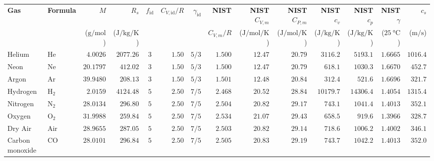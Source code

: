 \begin{table}[!htbp]
\centering
{}\label{tab:06:gas-properties}
\footnotesize\setlength{\tabcolsep}{3.2pt}\renewcommand{\arraystretch}{1.10}
\begin{tabularx}{\linewidth}{@{}l l r r c r r r r r r r r r@{}}
\toprule
\textbf{Gas} & \textbf{Formula} & $M$ & $R_s$ & $f_{\mathrm{id}}$ & $C_{V,\mathrm{id}}/R$ & $\gamma_{\mathrm{id}}$ & \textbf{NIST} & \textbf{NIST} $C_{V,m}$ & \textbf{NIST} $C_{P,m}$ & \textbf{NIST} $c_v$ & \textbf{NIST} $c_p$ & \textbf{NIST} $\gamma$ & $c_s$ \\
 & & ($\si{\gram\per\mole}$) & ($\si{\joule\per\kilogram\per\kelvin}$) & & & & $C_{V,m}/R$ & ($\si{\joule\per\mole\per\kelvin}$) & ($\si{\joule\per\mole\per\kelvin}$) & ($\si{\joule\per\kilogram\per\kelvin}$) & ($\si{\joule\per\kilogram\per\kelvin}$) & ($\SI{25}{\celsius}$) & ($\si{\meter\per\second}$) \\
\midrule
Helium & $\mathrm{He}$ & $4.0026$ & $2077.26$ & $3$ & $1.50$ & $5/3$ & $1.500$ & $12.47$ & $20.79$ & $3116.2$ & $5193.1$ & $1.6665$ & $1016.4$ \\
Neon & $\mathrm{Ne}$ & $20.1797$ & $412.02$ & $3$ & $1.50$ & $5/3$ & $1.500$ & $12.47$ & $20.79$ & $618.1$ & $1030.3$ & $1.6670$ & $452.7$ \\
Argon & $\mathrm{Ar}$ & $39.9480$ & $208.13$ & $3$ & $1.50$ & $5/3$ & $1.501$ & $12.48$ & $20.84$ & $312.4$ & $521.6$ & $1.6696$ & $321.7$ \\
Hydrogen & $\mathrm{H_2}$ & $2.0159$ & $4124.48$ & $5$ & $2.50$ & $7/5$ & $2.468$ & $20.52$ & $28.84$ & $10179.7$ & $14306.4$ & $1.4054$ & $1315.4$ \\
Nitrogen & $\mathrm{N_2}$ & $28.0134$ & $296.80$ & $5$ & $2.50$ & $7/5$ & $2.504$ & $20.82$ & $29.17$ & $743.1$ & $1041.4$ & $1.4013$ & $352.1$ \\
Oxygen & $\mathrm{O_2}$ & $31.9988$ & $259.84$ & $5$ & $2.50$ & $7/5$ & $2.534$ & $21.07$ & $29.43$ & $658.5$ & $919.6$ & $1.3966$ & $328.7$ \\
Dry Air & $\mathrm{Air}$ & $28.9655$ & $287.05$ & $5$ & $2.50$ & $7/5$ & $2.503$ & $20.82$ & $29.14$ & $718.6$ & $1006.2$ & $1.4002$ & $346.1$ \\
Carbon monoxide & $\mathrm{CO}$ & $28.0101$ & $296.84$ & $5$ & $2.50$ & $7/5$ & $2.505$ & $20.83$ & $29.19$ & $743.7$ & $1042.2$ & $1.4013$ & $352.0$ \\

\end{tabularx}
\end{table}
